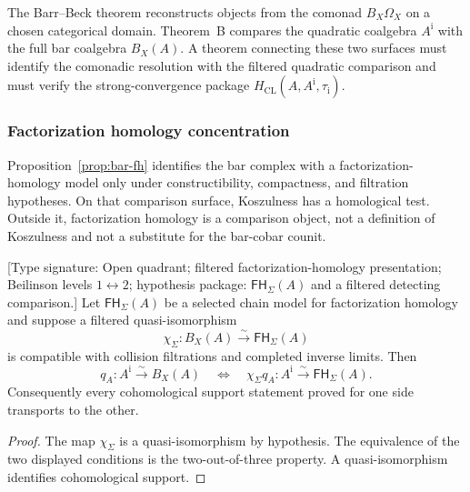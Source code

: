 \begin{remark}
\label{rem:bbl-content}
The Barr--Beck theorem reconstructs objects from the comonad
\(B_X\Omega_X\) on a chosen categorical domain.  Theorem~B compares
the quadratic coalgebra \(A^{\mathrm i}\) with the full bar coalgebra
\(B_X(A)\).  A theorem connecting these two surfaces must identify
the comonadic resolution with the filtered quadratic comparison and
must verify the strong-convergence package
\(H_{\mathrm{CL}}(A,A^{\mathrm i},\tau_{\mathrm i})\).
\end{remark}

\medskip

\subsubsection{Factorization homology concentration}

Proposition~\ref{prop:bar-fh} identifies the bar complex with a
factorization-homology model only under constructibility, compactness,
and filtration hypotheses. On that comparison surface, Koszulness has
a homological test. Outside it, factorization homology is a comparison
object, not a definition of Koszulness and not a substitute for the
bar-cobar counit.

\begin{theorem}
\label{thm:fh-concentration-koszulness}
\textup{[Type signature: Open quadrant; filtered
factorization-homology presentation; Beilinson levels
\(1\leftrightarrow2\); hypothesis package:
\(\mathsf{FH}_{\Sigma}(A)\) and a filtered detecting comparison.]}
Let \(\mathsf{FH}_{\Sigma}(A)\) be a selected chain model for
factorization homology and suppose a filtered quasi-isomorphism
\[
\chi_\Sigma\colon B_X(A)\xrightarrow{\sim}
\mathsf{FH}_{\Sigma}(A)
\]
is compatible with collision filtrations and completed inverse
limits.  Then
\[
q_A\colon A^{\mathrm i}\xrightarrow{\sim}B_X(A)
\quad\Longleftrightarrow\quad
\chi_\Sigma q_A\colon A^{\mathrm i}
\xrightarrow{\sim}\mathsf{FH}_{\Sigma}(A).
\]
Consequently every cohomological support statement proved for one
side transports to the other.
\end{theorem}

\begin{proof}
The map \(\chi_\Sigma\) is a quasi-isomorphism by hypothesis.
The equivalence of the two displayed conditions is the
two-out-of-three property.  A quasi-isomorphism identifies
cohomological support.
\end{proof}

